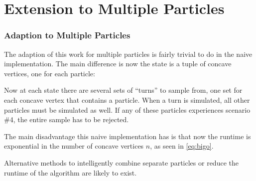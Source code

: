   \chapter{Extension to Multiple Particles}

  \subsection{Adaption to Multiple Particles}

The adaption of this work for multiple particles is fairly trivial to do in the naive implementation. The main difference is now the state is a tuple of concave vertices, one for each particle:

 {
  \label{eq:multipleParticleStateSpace}
}

Now at each state there are several sets of ``turns'' to sample from, one set for each concave vertex that contains a particle. When a turn is simulated, all other particles must be simulated as well. If any of these particles experiences scenario \#4, the entire sample has to be rejected.

The main disadvantage this naive implementation has is that now the runtime is exponential in the number of concave vertices $n$, as seen in \eqref{eq:bigo}.

 {
  \label{eq:bigoTotal}
}

Alternative methods to intelligently combine separate particles or reduce the runtime of the algorithm are likely to exist.
